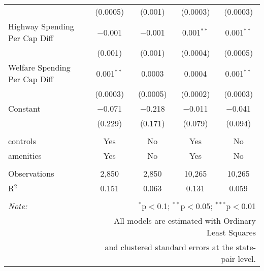 \begin{table}[!htbp]
\begin{tabular}{@{\extracolsep{5pt}}lcccc}
  & (0.0005) & (0.001) & (0.0003) & (0.0003) \\ 
  Highway Spending Per Cap Diff & $-$0.001 & $-$0.001 & 0.001$^{**}$ & 0.001$^{**}$ \\ 
  & (0.001) & (0.001) & (0.0004) & (0.0005) \\ 
  Welfare Spending Per Cap Diff & 0.001$^{**}$ & 0.0003 & 0.0004 & 0.001$^{**}$ \\ 
  & (0.0003) & (0.0005) & (0.0002) & (0.0003) \\ 
  Constant & $-$0.071 & $-$0.218 & $-$0.011 & $-$0.041 \\ 
  & (0.229) & (0.171) & (0.079) & (0.094) \\ 
 \hline \\[-1.8ex] 
controls & Yes & No & Yes & No \\ 
amenities & Yes & No & Yes & No \\ 
\hline \\[-1.8ex] 
Observations & 2,850 & 2,850 & 10,265 & 10,265 \\ 
R$^{2}$ & 0.151 & 0.063 & 0.131 & 0.059 \\ 
\hline 
\hline \\[-1.8ex] 
\textit{Note:}  & \multicolumn{4}{r}{$^{*}$p$<$0.1; $^{**}$p$<$0.05; $^{***}$p$<$0.01} \\ 
 & \multicolumn{4}{r}{All models are estimated with Ordinary Least Squares} \\ 
 & \multicolumn{4}{r}{and clustered standard errors at the state-pair level.} \\ 
\end{tabular} 
\end{table} 
